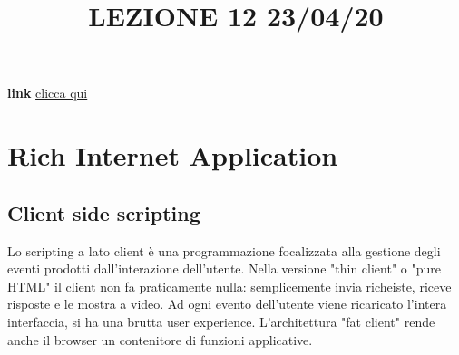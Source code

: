 \title{LEZIONE 12 23/04/20}
\textbf{link} \href{https://web.microsoftstream.com/video/55f4d4bd-8efe-48d2-870d-78b0a6baa77d?list=user&userId=cfe0965d-9a7c-40e2-be6e-f078296a1914}{clicca qui}
\section{Rich Internet Application}
\subsection{Client side scripting}
Lo scripting a lato client è una programmazione focalizzata alla gestione degli eventi prodotti dall'interazione dell'utente.\newline
\newline
Nella versione "thin client" o "pure HTML" il client non fa praticamente nulla: semplicemente invia richeiste, riceve risposte e le mostra a video. Ad ogni evento dell'utente viene ricaricato l'intera interfaccia, si ha una brutta user experience.\newline
\newline
L'architettura "fat client" rende anche il browser un contenitore di funzioni applicative. 
